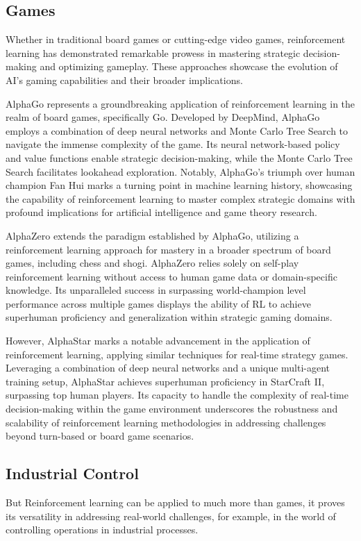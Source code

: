 \subsection*{Games}
Whether in traditional board games or cutting-edge video games, reinforcement learning has demonstrated remarkable prowess in mastering strategic decision-making and optimizing gameplay. These approaches showcase the evolution of AI's gaming capabilities and their broader implications.

AlphaGo\cite{silver2016mastering} represents a groundbreaking application of reinforcement learning in the realm of board games, specifically Go. Developed by DeepMind, AlphaGo employs a combination of deep neural networks and Monte Carlo Tree Search to navigate the immense complexity of the game. Its neural network-based policy and value functions enable strategic decision-making, while the Monte Carlo Tree Search facilitates lookahead exploration. Notably, AlphaGo's triumph over human champion Fan Hui marks a turning point in machine learning history, showcasing the capability of reinforcement learning to master complex strategic domains with profound implications for artificial intelligence and game theory research.

AlphaZero\cite{silver2017mastering} extends the paradigm established by AlphaGo, utilizing a reinforcement learning approach for mastery in a broader spectrum of board games, including chess and shogi. AlphaZero relies solely on self-play reinforcement learning without access to human game data or domain-specific knowledge. Its unparalleled success in surpassing world-champion level performance across multiple games displays the ability of RL to achieve superhuman proficiency and generalization within strategic gaming domains.

However, AlphaStar\cite{vinyals2019grandmaster} marks a notable advancement in the application of reinforcement learning, applying similar techniques for real-time strategy games. Leveraging a combination of deep neural networks and a unique multi-agent training setup, AlphaStar achieves superhuman proficiency in StarCraft II, surpassing top human players. Its capacity to handle the complexity of real-time decision-making within the game environment underscores the robustness and scalability of reinforcement learning methodologies in addressing challenges beyond turn-based or board game scenarios.

\subsection*{Industrial Control}
But Reinforcement learning can be applied to much more than games, it proves its versatility in addressing real-world challenges, for example, in the world of controlling operations in industrial processes.

